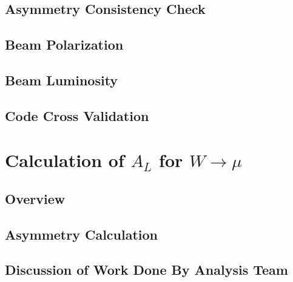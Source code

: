 \subsection{Asymmetry Consistency Check}
\subsection{Beam Polarization}
\subsection{Beam Luminosity}
\subsection{Code Cross Validation}
\section{Calculation of $A_{L}$ for $W\rightarrow\mu$}
\subsection{Overview}
\subsection{Asymmetry Calculation}
\subsection{Discussion of Work Done By Analysis Team}
